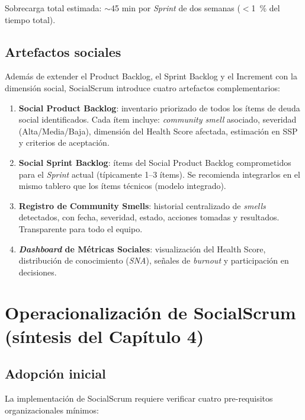 Sobrecarga total estimada: $\sim$45 min por \textit{Sprint} de dos semanas ($<$1~\% del tiempo total).

\subsection{Artefactos sociales}

Además de extender el Product Backlog, el Sprint Backlog y el Increment con la dimensión social, SocialScrum introduce cuatro artefactos complementarios:

\begin{enumerate}
    \item \textbf{Social Product Backlog}: inventario priorizado de todos los ítems de deuda social identificados. Cada ítem incluye: \textit{community smell} asociado, severidad (Alta/Media/Baja), dimensión del Health Score afectada, estimación en SSP y criterios de aceptación.
    \item \textbf{Social Sprint Backlog}: ítems del Social Product Backlog comprometidos para el \textit{Sprint} actual (típicamente 1--3 ítems). Se recomienda integrarlos en el mismo tablero que los ítems técnicos (modelo integrado).
    \item \textbf{Registro de Community Smells}: historial centralizado de \textit{smells} detectados, con fecha, severidad, estado, acciones tomadas y resultados. Transparente para todo el equipo.
    \item \textbf{\textit{Dashboard} de Métricas Sociales}: visualización del Health Score, distribución de conocimiento (\textit{SNA}), señales de \textit{burnout} y participación en decisiones.
\end{enumerate}

\section{Operacionalización de SocialScrum (síntesis del Capítulo 4)}

\subsection{Adopción inicial}

La implementación de SocialScrum requiere verificar cuatro pre-requisitos organizacionales mínimos:

